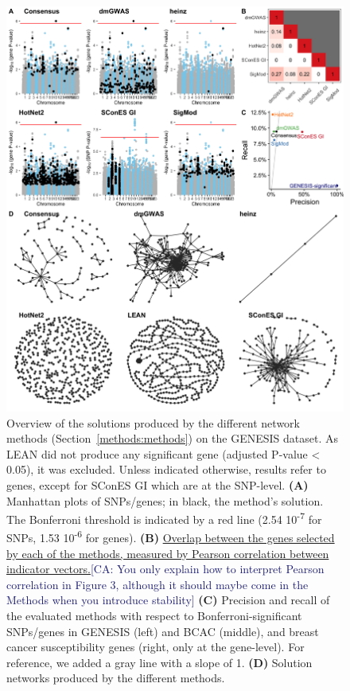 \documentclass[twocolumn, 11pt]{article}
\newcommand{\cazcom}[2]{{\uline{#1}}\unskip\space\textcolor{MidnightBlue}{[CA: #2]}}
\begin{document}
\begin{figure}[htbp]
  \centering
  \includegraphics[height=.75\textheight]{./figures/figure_1.png}
  \caption{\label{fig:solution_overview} Overview of the solutions produced by the different network methods (Section~\ref{methods:methods}) on the GENESIS dataset. As LEAN did not produce any significant gene (adjusted P-value < 0.05), it was excluded. Unless indicated otherwise, results refer to genes, except for SConES GI which are at the SNP-level. \textbf{(A)} Manhattan plots of SNPs/genes; in black, the method's solution. The Bonferroni threshold is indicated by a red line (2.54 \texttimes{} 10\textsuperscript{-7} for SNPs, 1.53 \texttimes{} 10\textsuperscript{-6} for genes). \textbf{(B)} \cazcom{Overlap between the genes selected by each of the methods, measured by Pearson correlation between indicator vectors.}{You only explain how to interpret Pearson correlation in Figure 3, although it should maybe come in the Methods when you introduce stability} \textbf{(C)} Precision and recall of the evaluated methods with respect to Bonferroni-significant SNPs/genes in GENESIS (left) and BCAC (middle), and breast cancer susceptibility genes (right, only at the gene-level). For reference, we added a gray line with a slope of 1. \textbf{(D)} Solution networks produced by the different methods.}
\end{figure}
\end{document}
